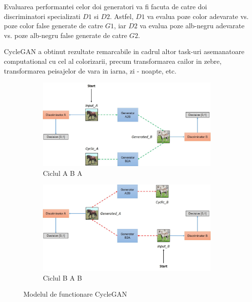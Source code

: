 \documentclass[12pt]{article}
\theoremstyle{definition}
\begin{document}
Evaluarea performantei celor doi generatori va fi facuta de catre doi discriminatori specializati $D1$ si $D2$. Astfel, $D1$ va evalua poze color adevarate vs. poze color false generate de catre $G1$, iar $D2$ va evalua poze alb-negru adevarate vs. poze alb-negru false generate de catre $G2$. 

CycleGAN a obtinut rezultate remarcabile in cadrul altor task-uri asemanatoare computational cu cel al colorizarii, precum transformarea cailor in zebre, transformarea peisajelor de vara in iarna, zi - noapte, etc.

\begin{figure}[H]
  \centering

	\begin{subfigure}{0.4\textwidth}
	    \centering
		\includegraphics[width=\linewidth]{model.jpg}
		\caption{Ciclul A \Rightarrow B \Rightarrow A}
	\end{subfigure}
	\vspace{1em}
	\begin{subfigure}{0.4\textwidth}
		\centering
		\includegraphics[width=\linewidth]{model1.jpg}
		\caption{Ciclul B \Rightarrow A \Rightarrow B}
	\end{subfigure}

  \caption{Modelul de functionare CycleGAN}
  \label{fig:architecture}
\end{figure}
\end{document}
